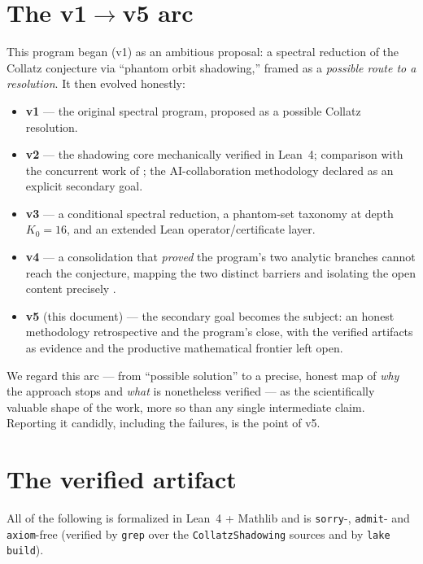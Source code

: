 \documentclass[11pt,a4paper]{article}
\theoremstyle{definition}
\begin{document}
\section{The v1$\to$v5 arc}
\label{sec:arc}

This program began (v1) as an ambitious proposal: a spectral reduction of
the Collatz conjecture via ``phantom orbit shadowing,'' framed as a
\emph{possible route to a resolution}. It then evolved honestly:

\begin{itemize}[leftmargin=2em]
  \item \textbf{v1} --- the original spectral program, proposed as a possible
        Collatz resolution.
  \item \textbf{v2} --- the shadowing core mechanically verified in Lean~4;
        comparison with the concurrent work of \cite{chang2026}; the
        AI-collaboration methodology declared as an explicit secondary goal.
  \item \textbf{v3} --- a conditional spectral reduction, a phantom-set
        taxonomy at depth $K_0=16$, and an extended Lean operator/certificate
        layer.
  \item \textbf{v4} --- a consolidation that \emph{proved} the program's two
        analytic branches cannot reach the conjecture, mapping the two
        distinct barriers and isolating the open content precisely
        \cite{borgatta_v4}.
  \item \textbf{v5} (this document) --- the secondary goal becomes the
        subject: an honest methodology retrospective and the program's close,
        with the verified artifacts as evidence and the productive
        mathematical frontier left open.
\end{itemize}

We regard this arc --- from ``possible solution'' to a precise, honest map
of \emph{why} the approach stops and \emph{what} is nonetheless verified ---
as the scientifically valuable shape of the work, more so than any single
intermediate claim. Reporting it candidly, including the failures, is the
point of v5.

\section{The verified artifact}
\label{sec:artifact}

All of the following is formalized in Lean~4 + Mathlib and is
\texttt{sorry}-, \texttt{admit}- and \texttt{axiom}-free (verified by
\texttt{grep} over the \texttt{CollatzShadowing} sources and by
\texttt{lake build}).
\end{document}
